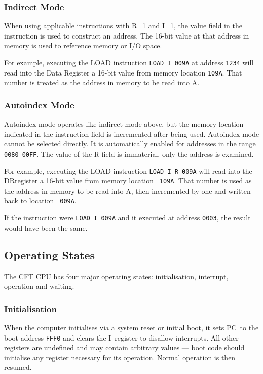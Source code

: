 \documentclass[11pt,a4paper,twocolumns]{article}
\newcommand\register[1]{\textsf{#1}}
\newcommand\A{\register{A}}
\newcommand\Ireg{\register{I}}
\newcommand\DR{\register{DR}}
\newcommand\PC{\register{PC}}
\begin{document}
\subsubsection{Indirect Mode}

When using applicable instructions with R=1 and I=1, the value field
in the instruction is used to construct an address. The 16-bit value
at that address in memory is used to reference memory or I/O space.

For example, executing the LOAD instruction {\tt LOAD I 009A} at
address {\tt 1234} will read into the Data Register a 16-bit value
from memory location {\tt 109A}. That number is treated as the address
in memory to be read into \A.

\subsubsection{Autoindex Mode}

Autoindex mode operates like indirect mode above, but the memory
location indicated in the instruction field is incremented after being
used. Autoindex mode cannot be selected directly. It is automatically
enabled for addresses in the range {\tt 0080}–{\tt 00FF}. The value of the R
field is immaterial, only the address is examined.

For example, executing the LOAD instruction {\tt LOAD I R 009A} will
read into the \DR register a 16-bit value from memory location {\tt
  109A}. That number is used as the address in memory to be read
into \A, then incremented by one and written back to location {\tt
  009A}.

If the instruction were {\tt LOAD I 009A} and it executed at address
{\tt 0003}, the result would have been the same.

\subsection{Operating States}

The CFT CPU has four major operating states: initialisation, interrupt,
operation and waiting.

\subsubsection{Initialisation}

When the computer initialises via a system reset or initial boot, it
sets \PC\  to the boot address {\tt FFF0} and clears the \Ireg\  register
to disallow interrupts. All other registers are undefined and may
contain arbitrary values — boot code should initialise any register
necessary for its operation. Normal operation is then resumed.
\end{document}
